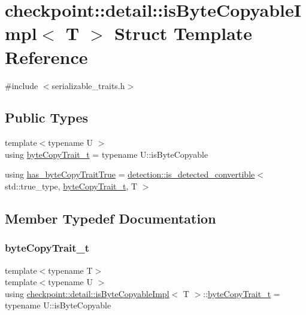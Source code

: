 \hypertarget{structcheckpoint_1_1detail_1_1is_byte_copyable_impl}{}\section{checkpoint\+:\+:detail\+:\+:is\+Byte\+Copyable\+Impl$<$ T $>$ Struct Template Reference}
\label{structcheckpoint_1_1detail_1_1is_byte_copyable_impl}


{\ttfamily \#include $<$serializable\+\_\+traits.\+h$>$}

\subsection*{Public Types}
\begin{DoxyCompactItemize}
\item 
{\footnotesize template$<$typename U $>$ }\\using \hyperlink{structcheckpoint_1_1detail_1_1is_byte_copyable_impl_a5ac4b9b4645bc6cfb4e68877719de938}{byte\+Copy\+Trait\+\_\+t} = typename U\+::is\+Byte\+Copyable
\item 
using \hyperlink{structcheckpoint_1_1detail_1_1is_byte_copyable_impl_a2370db16994d2162a2806de74f322978}{has\+\_\+byte\+Copy\+Trait\+True} = \hyperlink{namespacedetection_afb970b23e39cfecb33449d40242c49ff}{detection\+::is\+\_\+detected\+\_\+convertible}$<$ std\+::true\+\_\+type, \hyperlink{structcheckpoint_1_1detail_1_1is_byte_copyable_impl_a5ac4b9b4645bc6cfb4e68877719de938}{byte\+Copy\+Trait\+\_\+t}, T $>$
\end{DoxyCompactItemize}


\subsection{Member Typedef Documentation}
\mbox{\label{structcheckpoint_1_1detail_1_1is_byte_copyable_impl_a5ac4b9b4645bc6cfb4e68877719de938}} 
\subsubsection{\texorpdfstring{byte\+Copy\+Trait\+\_\+t}{byteCopyTrait\_t}}
{\footnotesize\ttfamily template$<$typename T$>$ \\
template$<$typename U $>$ \\
using \hyperlink{structcheckpoint_1_1detail_1_1is_byte_copyable_impl}{checkpoint\+::detail\+::is\+Byte\+Copyable\+Impl}$<$ T $>$\+::\hyperlink{structcheckpoint_1_1detail_1_1is_byte_copyable_impl_a5ac4b9b4645bc6cfb4e68877719de938}{byte\+Copy\+Trait\+\_\+t} =  typename U\+::is\+Byte\+Copyable}

